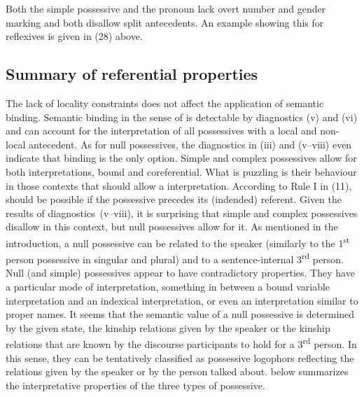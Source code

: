 \documentclass[output=paper]{langsci/langscibook}
\begin{document}
Both the simple possessive and the  pronoun lack overt number and gender marking and both disallow split antecedents. An example showing this for reflexives is given in (28) above. 

\subsection{Summary of referential properties}%

The lack of locality constraints does not affect the application of semantic binding. Semantic binding in the sense of \citet{Reinhart2006} is detectable by diagnostics (v) and (vi) and can account for the interpretation of all possessives with a local and non-local antecedent. As for null possessives, the diagnostics in (iii) and (v--viii) even indicate that binding is the only option. Simple and complex possessives allow for both interpretations, bound and coreferential. What is puzzling is their behaviour in those contexts that should allow a  interpretation. According to Rule I in (11),  should be possible if the possessive precedes its (indended) referent. Given the results of diagnostics~(v--viii), it is surprising that simple and complex possessives disallow  in this context, but null possessives allow for it. As mentioned in the introduction, a null possessive can be related to the speaker (similarly to the 1\textsuperscript{st} person possessive in singular and plural) and to a sentence-internal 3\textsuperscript{rd} person. Null (and simple) possessives appear to have contradictory properties. They have a particular mode of interpretation, something in between a bound variable interpretation and an indexical interpretation, or even an interpretation similar to proper names. It seems that the semantic value of a null possessive is determined by the given state, the kinship relations given by the speaker or the kinship relations that are known by the discourse participants to hold for a 3\textsuperscript{rd} person. In this sense, they can be tentatively classified as possessive logophors reflecting the relations given by the speaker or by the person talked about.  below summarizes the interpretative properties of the three types of possessive.
\end{document}
